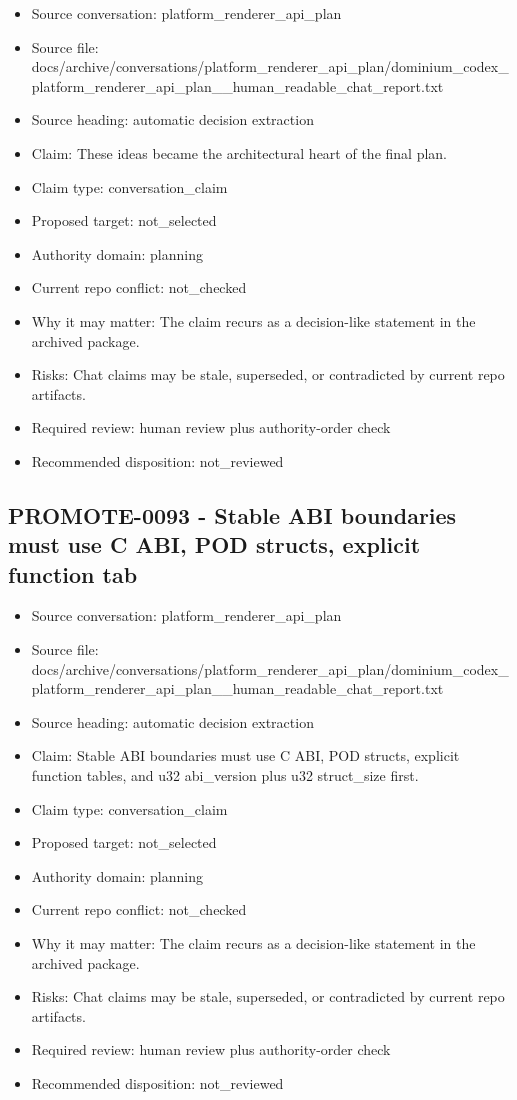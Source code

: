 \documentclass[11pt,a4paper]{report}
\begin{document}
\begin{itemize}
\item Source conversation: platform\_renderer\_api\_plan
\item Source file: docs/archive/conversations/platform\_renderer\_api\_plan/dominium\_codex\_platform\_renderer\_api\_plan\_\_human\_readable\_chat\_report.txt
\item Source heading: automatic decision extraction
\item Claim: These ideas became the architectural heart of the final plan.
\item Claim type: conversation\_claim
\item Proposed target: not\_selected
\item Authority domain: planning
\item Current repo conflict: not\_checked
\item Why it may matter: The claim recurs as a decision-like statement in the archived package.
\item Risks: Chat claims may be stale, superseded, or contradicted by current repo artifacts.
\item Required review: human review plus authority-order check
\item Recommended disposition: not\_reviewed
\end{itemize}

\subsection{PROMOTE-0093 - Stable ABI boundaries must use C ABI, POD structs, explicit function tab}

\begin{itemize}
\item Source conversation: platform\_renderer\_api\_plan
\item Source file: docs/archive/conversations/platform\_renderer\_api\_plan/dominium\_codex\_platform\_renderer\_api\_plan\_\_human\_readable\_chat\_report.txt
\item Source heading: automatic decision extraction
\item Claim: Stable ABI boundaries must use C ABI, POD structs, explicit function tables, and u32 abi\_version plus u32 struct\_size first.
\item Claim type: conversation\_claim
\item Proposed target: not\_selected
\item Authority domain: planning
\item Current repo conflict: not\_checked
\item Why it may matter: The claim recurs as a decision-like statement in the archived package.
\item Risks: Chat claims may be stale, superseded, or contradicted by current repo artifacts.
\item Required review: human review plus authority-order check
\item Recommended disposition: not\_reviewed
\end{itemize}
\end{document}
